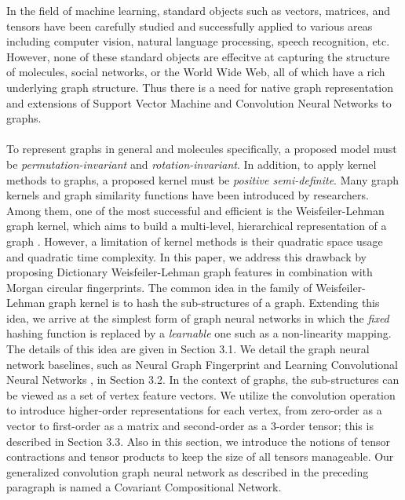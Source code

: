 \documentclass[a4paper]{article}
\begin{document}
In the field of machine learning, standard objects such as vectors, matrices, and tensors have been carefully studied and successfully applied to various areas including computer vision, natural language processing, speech recognition, etc. However, none of these standard objects are effecitve at capturing the structure of molecules, social networks, or the World Wide Web, all of which have a rich underlying graph structure. Thus there is a need for native graph representation and extensions of Support Vector Machine and Convolution Neural Networks to graphs. \\ \\
To represent graphs in general and molecules specifically, a proposed model must be \textit{permutation-invariant} and \textit{rotation-invariant}. In addition, to apply kernel methods to graphs, a proposed kernel must be \textit{positive semi-definite}. Many graph kernels and graph similarity functions have been introduced by researchers. Among them, one of the most successful and efficient is the Weisfeiler-Lehman graph kernel, which aims to build a multi-level, hierarchical representation of a graph \cite{Nino}. However, a limitation of kernel methods is their quadratic space usage and quadratic time complexity. In this paper, we address this drawback by proposing Dictionary Weisfeiler-Lehman graph features in combination with Morgan circular fingerprints. The common idea in the family of Weisfeiler-Lehman graph kernel is to hash the sub-structures of a graph. Extending this idea, we arrive at the simplest form of graph neural networks in which the \textit{fixed} hashing function is replaced by a \textit{learnable} one such as a non-linearity mapping. The details of this idea are given in Section 3.1. We detail the graph neural network baselines, such as Neural Graph Fingerprint \cite{Duvenaud} and Learning Convolutional Neural Networks \cite{Niepert}, in Section 3.2. In the context of graphs, the sub-structures can be viewed as a set of vertex feature vectors. We utilize the convolution operation to introduce higher-order representations for each vertex, from zero-order as a vector to first-order as a matrix and second-order as a 3-order tensor; this is described in Section 3.3. Also in this section, we introduce the notions of tensor contractions and tensor products to keep the size of all tensors manageable. Our generalized convolution graph neural network as described in the preceding paragraph is named a Covariant Compositional Network. \\ \\
\end{document}
